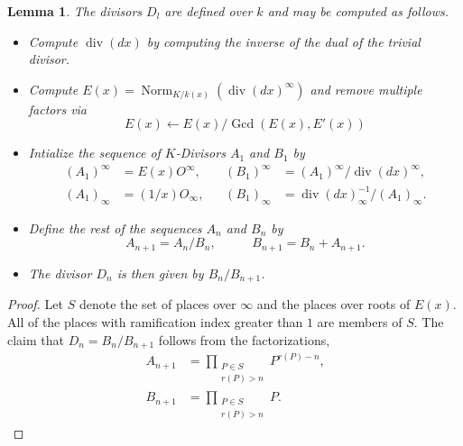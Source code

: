 \documentclass[12pt,reqno]{amsart}
\numberwithin{equation}{section}
\newtheorem{lemma}[theorem]{Lemma}
\begin{document}
\begin{lemma}
\label{algo_rami}
The divisors $D_l$ are defined over $k$ and may be computed as follows.
  \begin{itemize}
  \item Compute $\operatorname{div}(dx)$ by computing the inverse of the dual of the trivial divisor.
  \item Compute $E(x)=\operatorname{Norm}_{K/k(x)}(\operatorname{div}(dx)^{\infty})$ and remove multiple factors via
      \begin{equation*}
      E(x) \leftarrow E(x)/\operatorname{Gcd}(E(x),E'(x)) 
      \end{equation*}
  \item Intialize the sequence of $K$-Divisors $A_1$ and $B_1$ by
    \begin{equation*}
    \begin{alignedat}{5}
    (A_1)^{\infty} &= E(x) O^{\infty}\text{,}& \quad
    (B_1)^{\infty} &= (A_1)^{\infty}/\operatorname{div}(dx)^{\infty}\text{,}\\
    (A_1)_{\infty} &= (1/x) O_{\infty}\text{,}& \quad
    (B_1)_{\infty} &= \operatorname{div}(dx)_{\infty}^{-1}/(A_1)_{\infty}\text{.}
    \end{alignedat}    
    \end{equation*}
  \item Define the rest of the sequences $A_n$ and $B_n$ by
    \begin{equation*}
    A_{n+1}=A_n/B_n\text{,}\quad \quad \quad B_{n+1}=B_{n}+A_{n+1}\text{.}
    \end{equation*}
  \item The divisor $D_{n}$ is then given by $B_{n}/B_{n+1}$.
  \end{itemize}
\end{lemma}
\begin{proof}
Let $S$ denote the set of places over $\infty$ and the places over roots of $E(x)$. All of the places with ramification index greater than $1$ are members of $S$. The claim that $D_{n}=B_{n}/B_{n+1}$ follows from the factorizations,
\begin{align*}
 A_{n+1} &= \prod_{\substack{P \in S \\ r(P)>n}} P^{r(P)-n}\text{,}\\
 B_{n+1} &= \prod_{\substack{P \in S \\ r(P)>n}} P\text{.}
\end{align*}
\end{proof}
\end{document}
